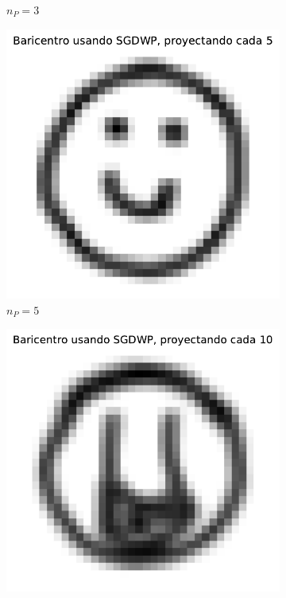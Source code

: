 \begin{figure}[htbp]
\begin{subfigure}[b]{0.23\textwidth}
        \caption{$n_P=3$}
        \label{fig:bar-SGDWP-pe-03}
    \end{subfigure}
    \hfill
    \begin{subfigure}[b]{0.23\textwidth}
        \centering
        \includegraphics[width=\textwidth]{img/sgdwp-pe/bar-SGDWP-pe-05.pdf}
        \caption{$n_P=5$}
        \label{fig:bar-SGDWP-pe-05}
    \end{subfigure}
    \hfill
    \begin{subfigure}[b]{0.23\textwidth}
        \centering
        \includegraphics[width=\textwidth]{img/sgdwp-pe/bar-SGDWP-pe-10.pdf}

\end{subfigure}
\end{figure}
